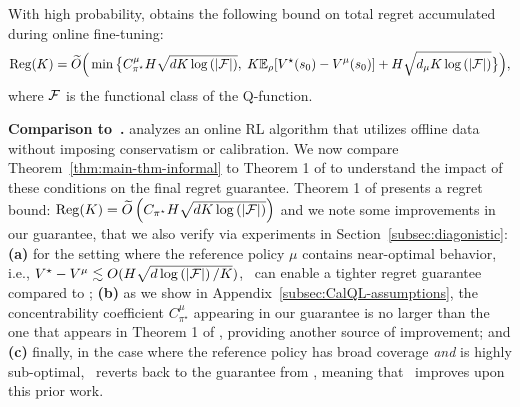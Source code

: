 \begin{theorem}
\label{thm:main-thm-informal}
    With high probability, \methodname{} obtains the following bound on total regret accumulated during online fine-tuning: \vspace{-0.15cm}
\begin{equation*}
    \begin{split}
        \mathrm{Reg}(K) = \widetilde{O}\Big(\min\big\{C_{\pi^\star}^\mu H\sqrt{dK\log\left( |\mathcal F| \right)},
        \;K\mathbb{E}_{\rho}[V^{\star}(s_0) -V^\mu(s_0)]+H\sqrt{d_\mu K\log\left( |\mathcal F| \right)}\big\}\Big),
    \end{split}
\end{equation*}
where $\mathcal F$ is the functional class of the Q-function.
\end{theorem}

{\textbf{Comparison to~\citet{song2023hybrid}.}}
\citet{song2023hybrid} analyzes an online RL algorithm that utilizes offline data without imposing conservatism or calibration. We now compare Theorem~\ref{thm:main-thm-informal} to Theorem 1 of \citet{song2023hybrid} to understand the impact of these conditions on the final regret guarantee. Theorem 1 of \citet{song2023hybrid} presents a regret bound: $\mathrm{Reg}(K) = \widetilde{O}\left( C_{\pi^\star} H \sqrt{d K \log\left( |\mathcal F| \right)} \right)$ and we note some improvements in our guarantee, that we also verify via experiments in Section~\ref{subsec:diagonistic}: \textbf{(a)} for the setting where the reference policy $\mu$ contains near-optimal behavior, i.e., $V^\star - V^\mu \lesssim O(H\sqrt{d\log\left( |\mathcal F| \right)/K})$, \methodname\ can enable a tighter regret guarantee compared to \citet{song2023hybrid}; \textbf{(b)} as we show in Appendix~\ref{subsec:CalQL-assumptions}, the concentrability coefficient $C^\mu_{\pi^\star}$ appearing in our guarantee is no larger than the one that appears in Theorem 1 of \citet{song2023hybrid}, providing another source of improvement; and \textbf{(c)} finally, in the case where the reference policy has broad coverage \emph{and} is highly sub-optimal, \methodname\ reverts back to the guarantee from \citep{song2023hybrid}, meaning that \methodname\ improves upon this prior work.


\vspace{-0.2cm}